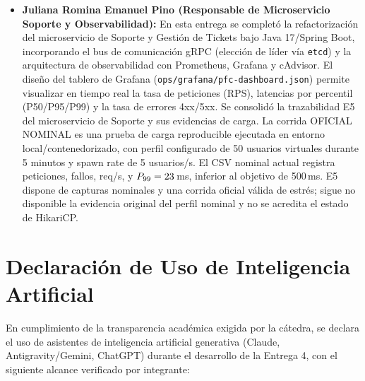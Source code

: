 \documentclass[11pt,a4paper]{article}
\begin{document}
\begin{itemize}[leftmargin=*]
  \item \textbf{Juliana Romina Emanuel Pino (Responsable de Microservicio Soporte y Observabilidad):} En esta entrega se completó la refactorización del microservicio de Soporte y Gestión de Tickets bajo Java 17/Spring Boot, incorporando el bus de comunicación gRPC (elección de líder vía \texttt{etcd}) y la arquitectura de observabilidad con Prometheus, Grafana y cAdvisor. El diseño del tablero de Grafana (\texttt{ops/grafana/pfc-dashboard.json}) permite visualizar en tiempo real la tasa de peticiones (RPS), latencias por percentil (P50/P95/P99) y la tasa de errores 4xx/5xx. Se consolidó la trazabilidad E5 del microservicio de Soporte y sus evidencias de carga. La corrida OFICIAL NOMINAL es una prueba de carga reproducible ejecutada en entorno local/contenedorizado, con perfil configurado de 50 usuarios virtuales durante 5 minutos y spawn rate de 5 usuarios/s. El CSV nominal actual registra \CargaPeticiones{} peticiones, \CargaFallos{} fallos, \CargaRPS{} req/s, y $P_{99}=23$\,ms, inferior al objetivo de 500\,ms. E5 dispone de capturas nominales y una corrida oficial válida de estrés; sigue no disponible la evidencia original del perfil nominal y no se acredita el estado de HikariCP.
\end{itemize}

\section{Declaración de Uso de Inteligencia Artificial}

En cumplimiento de la transparencia académica exigida por la cátedra, se declara el uso de asistentes de inteligencia artificial generativa (Claude, Antigravity/Gemini, ChatGPT) durante el desarrollo de la Entrega 4, con el siguiente alcance verificado por integrante:
\end{document}
